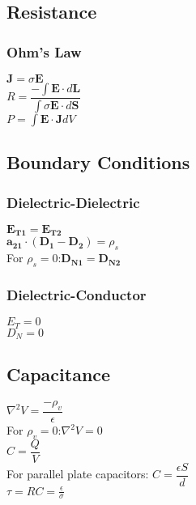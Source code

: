 \documentclass[12pt]{exam}
\begin{document}
\begin{multicols}{2}
\begin{flushleft}
	\subsection*{Resistance}
	\subsubsection*{Ohm's Law}
	{ \addtolength{\leftskip}{0.5in}
		$\mathbf{J} = \sigma\mathbf{E} $ \\[4pt]
		$R = \dfrac{-\int\mathbf{E}\cdot d\mathbf{L}}{\int\sigma\mathbf{E}\cdot d\mathbf{S}} $ \\[4pt]
		$P = \int\mathbf{E}\cdot\mathbf{J}dV $ \\
	}
	

	
	\subsection*{Boundary Conditions}
	\subsubsection*{Dielectric-Dielectric}
	{ \addtolength{\leftskip}{0.5in}
		$\mathbf{E_{T1}} = \mathbf{E_{T2}} $ \\[4pt]
		$\mathbf{a_{21}}\cdot(\mathbf{D_1}-\mathbf{D_2}) = \rho_s $ \\[4pt]
		For $\rho_s = 0$:\quad$\mathbf{D_{N1}}=\mathbf{D_{N2}} $ \\
	}
	\subsubsection*{Dielectric-Conductor}
	{ \addtolength{\leftskip}{0.5in}
		$E_T = 0$ \\
		$D_N = 0$ \\
	}
	
	\subsection*{Capacitance}
	{ \addtolength{\leftskip}{0.5in}
		$\nabla^2V = \dfrac{-\rho_v}{\epsilon} $ \\[4pt]
		For $\rho_v = 0$:\quad $\nabla^2V = 0$ \\[4pt]
		$C = \dfrac{Q}{V} $ \\[4pt]
		For parallel plate capacitors: $C = \dfrac{\epsilon S}{d}$ \\[4pt]
		$\tau = RC = \frac{\epsilon}{\sigma}$\\[4pt]
	}
	

\end{flushleft}
\end{multicols}
\end{document}
